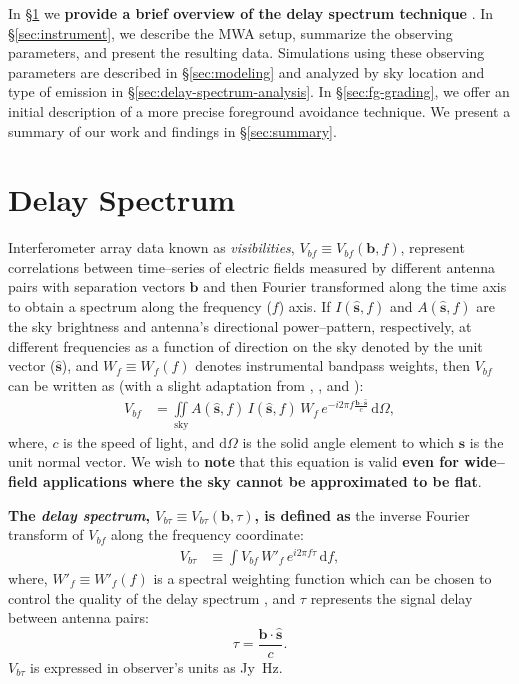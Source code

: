 \documentclass[preprint2,iop,numberedappendix]{emulateapj}
\newcommand{\dif}{\mathrm{d}}
\begin{document}
In \S\ref{sec:delay-spectrum} we {\bf provide a brief overview of the delay spectrum technique} \citep{par12a,par12b}. In \S\ref{sec:instrument}, we describe the MWA setup, summarize the observing parameters, and present the resulting data. Simulations using these observing parameters are described in \S\ref{sec:modeling} and analyzed by sky location and type of emission in \S\ref{sec:delay-spectrum-analysis}. In \S\ref{sec:fg-grading}, we offer an initial description of a more precise foreground avoidance technique. We present a summary of our work and findings in \S\ref{sec:summary}.

\section{Delay Spectrum}\label{sec:delay-spectrum}

Interferometer array data known as {\it visibilities}, $V_{bf}\equiv V_{bf}(\boldsymbol{b},f)$, represent correlations between time--series of electric fields measured by different antenna pairs with separation vectors $\boldsymbol{b}$ and then Fourier transformed along the time axis to obtain a spectrum along the frequency ($f$) axis. If $I(\hat{\boldsymbol{s}},f)$ and $A(\hat{\boldsymbol{s}},f)$ are the sky brightness and antenna's directional power--pattern, respectively, at different frequencies as a function of direction on the sky denoted by the unit vector ($\hat{\boldsymbol{s}}$), and $W_f\equiv W_f(f)$ denotes instrumental bandpass weights, then $V_{bf}$ can be written as (with a slight adaptation from \citet{van34}, \citet{zer38}, and \citet{tho01}):
\begin{align}\label{eqn:obsvis}
  V_{bf} &= \iint\limits_\textrm{sky} A(\hat{\boldsymbol{s}},f)\,I(\hat{\boldsymbol{s}},f)\,W_f\,e^{-i2\pi f\frac{\boldsymbol{b}\cdot\hat{\boldsymbol{s}}}{c}}\,\dif\Omega,
\end{align}
where, $c$ is the speed of light, and $\dif\Omega$ is the solid angle element to which $\hat{\boldsymbol{s}}$ is the unit normal vector. We wish to {\bf note} that this equation is valid {\bf even for wide--field applications where the sky cannot be approximated to be flat}.

{\bf The {\it delay spectrum}, $V_{b\tau}\equiv V_{b\tau}(\boldsymbol{b},\tau)$, is defined as} the inverse Fourier transform of $V_{bf}$ along the frequency coordinate:
\begin{align}\label{eqn:delay-transform}
  V_{b\tau} &\equiv \int V_{bf}\,W'_f\,e^{i2\pi f\tau}\,\dif f,
\end{align}
where, $W'_f\equiv W'_f(f)$ is a spectral weighting function which can be chosen to control the quality of the delay spectrum \citep{thy13,ved12}, and $\tau$ represents the signal delay between antenna pairs:
\begin{equation}\label{eqn:delay}
  \tau = \frac{\boldsymbol{b}\cdot\hat{\boldsymbol{s}}}{c}.
\end{equation}
$V_{b\tau}$ is expressed in observer's units as Jy~Hz.
\end{document}
